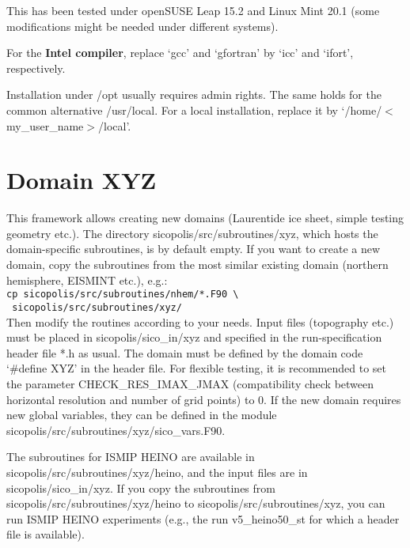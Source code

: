 \documentclass[12pt,a4paper]{article}
\begin{document}
\begin{appendix}
This has been tested under openSUSE Leap 15.2 and Linux Mint 20.1 (some modifications might be needed under different systems).

For the \textbf{Intel compiler}, replace `gcc' and `gfortran' by `icc' and `ifort', respectively.

Installation under /opt usually requires admin rights. The same holds for the common alternative /usr/local. For a local installation, replace it by `/home/$<$my\_user\_name$>$/local'.

\section{Domain XYZ}
\label{sect_xyz}

This framework allows creating new domains (Laurentide ice sheet, simple testing geometry etc.). The directory sicopolis/src/subroutines/xyz, which hosts the domain-specific subroutines, is by default empty. If you want to create a new domain, copy the subroutines from the most similar existing domain (northern hemisphere, EISMINT etc.), e.g.:
\\
\hspace*{10mm}\verb+cp sicopolis/src/subroutines/nhem/*.F90 \+
\\[-0.5ex]
\hspace*{14.3mm}\verb+ sicopolis/src/subroutines/xyz/ +
\\
Then modify the routines according to your needs. Input files (topography etc.) must be placed in sicopolis/sico\_in/xyz and specified in the run-specification header file *.h as usual. The domain must be defined by the domain code `\#define XYZ' in the header file. For flexible testing, it is recommended to set the parameter CHECK\_RES\_IMAX\_JMAX (compatibility check between horizontal resolution and number of grid points) to 0. If the new domain requires new global variables, they can be defined in the module sicopolis/src/subroutines/xyz/sico\_vars.F90.

The subroutines for ISMIP HEINO are available in sicopolis/src/subroutines/xyz/heino, and the input files are in sicopolis/sico\_in/xyz. If you copy the subroutines from sicopo\-lis/src/subroutines/xyz/heino to sicopolis/src/subroutines/xyz, you can run ISMIP HEINO experiments (e.g., the run v5\_heino50\_st for which a header file is available).


\clearpage

\rule{0mm}{0mm}\vfill


\end{appendix}
\end{document}
